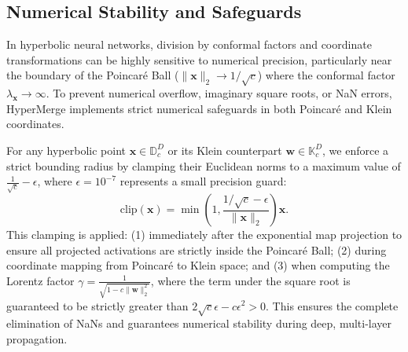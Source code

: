 \subsection{Numerical Stability and Safeguards}
In hyperbolic neural networks, division by conformal factors and coordinate transformations can be highly sensitive to numerical precision, particularly near the boundary of the Poincaré Ball ($\|\mathbf{x}\|_2 \to 1/\sqrt{c}$) where the conformal factor $\lambda_{\mathbf{x}} \to \infty$. To prevent numerical overflow, imaginary square roots, or NaN errors, HyperMerge implements strict numerical safeguards in both Poincaré and Klein coordinates.

For any hyperbolic point $\mathbf{x} \in \mathbb{D}_c^D$ or its Klein counterpart $\mathbf{w} \in \mathbb{K}_c^D$, we enforce a strict bounding radius by clamping their Euclidean norms to a maximum value of $\frac{1}{\sqrt{c}} - \epsilon$, where $\epsilon = 10^{-7}$ represents a small precision guard:
\begin{equation}
\text{clip}(\mathbf{x}) = \min\left(1, \frac{1/\sqrt{c} - \epsilon}{\|\mathbf{x}\|_2}\right) \mathbf{x}.
\end{equation}
This clamping is applied: (1) immediately after the exponential map projection to ensure all projected activations are strictly inside the Poincaré Ball; (2) during coordinate mapping from Poincaré to Klein space; and (3) when computing the Lorentz factor $\gamma = \frac{1}{\sqrt{1 - c \|\mathbf{w}\|_2^2}}$, where the term under the square root is guaranteed to be strictly greater than $2\sqrt{c}\epsilon - c\epsilon^2 > 0$. This ensures the complete elimination of NaNs and guarantees numerical stability during deep, multi-layer propagation.

